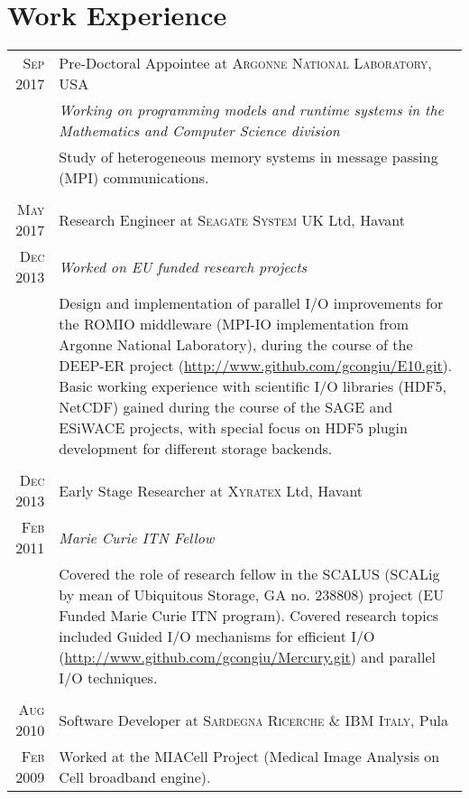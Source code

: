 \documentclass[a4paper,titlepage,oneside,11pt]{book}
\begin{document}
\section*{Work Experience}
\begin{tabular}{r|p{11cm}}
\textsc{Sep 2017} & Pre-Doctoral Appointee at \textsc{Argonne National Laboratory}, USA \\\textsc{}&
    \emph{Working on programming models and runtime systems in the Mathematics and Computer Science division}\\&
    \footnotesize{Study of heterogeneous memory systems in message passing (MPI) communications.}\\\multicolumn{2}{c}{} \\
\textsc{May 2017} & Research Engineer at \textsc{Seagate System UK} Ltd, Havant \\\textsc{Dec 2013}&\emph{Worked on EU funded research projects}\\&
    \footnotesize{Design and implementation of parallel I/O improvements for the ROMIO middleware (MPI-IO implementation from Argonne National Laboratory),
    during the course of the DEEP-ER project (\url{http://www.github.com/gcongiu/E10.git}). Basic working experience with scientific I/O libraries
    (HDF5, NetCDF) gained during the course of the SAGE and ESiWACE projects, with special focus on HDF5 plugin development for different storage
    backends.}\\\multicolumn{2}{c}{} \\
\textsc{Dec 2013} & Early Stage Researcher at \textsc{Xyratex} Ltd, Havant \\\textsc{Feb 2011}&\emph{Marie Curie ITN Fellow}\\&
    \footnotesize{Covered the role of research fellow in the SCALUS (SCALig by mean of Ubiquitous Storage, GA no. 238808) project (EU Funded Marie Curie ITN program).
    Covered research topics included Guided I/O mechanisms for efficient I/O (\url{http://www.github.com/gcongiu/Mercury.git}) and parallel I/O
    techniques.}\\\multicolumn{2}{c}{} \\
\textsc{Aug 2010} & Software Developer at \textsc{Sardegna Ricerche \& IBM Italy}, Pula \\\textsc{Feb 2009}&
    \footnotesize{Worked at the MIACell Project (Medical Image Analysis on Cell broadband engine).}
\end{tabular}

\end{document}
